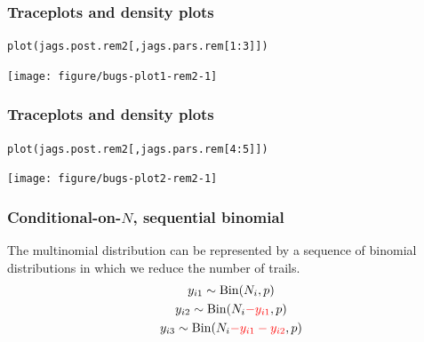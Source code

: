 \documentclass[color=usenames,dvipsnames]{beamer}\usepackage[]{graphicx}\usepackage[]{color}
\makeatletter
\newcommand{\hlnum}[1]{\textcolor[rgb]{0.69,0.494,0}{#1}}%
\newcommand{\hlopt}[1]{\textcolor[rgb]{0,0,0}{#1}}%
\newcommand{\hlstd}[1]{\textcolor[rgb]{0,0,0}{#1}}%
\newcommand{\hlkwd}[1]{\textcolor[rgb]{0.004,0.004,0.506}{#1}}%
\newenvironment{kframe}{%
 \def\at@end@of@kframe{}%
 \ifinner\ifhmode%
  \def\at@end@of@kframe{\end{minipage}}%
  \begin{minipage}{\columnwidth}%
 \fi\fi%
 \def\FrameCommand##1{\hskip\@totalleftmargin \hskip-\fboxsep
 \colorbox{shadecolor}{##1}\hskip-\fboxsep
     \hskip-\linewidth \hskip-\@totalleftmargin \hskip\columnwidth}%
 \MakeFramed {\advance\hsize-\width
   \@totalleftmargin\z@ \linewidth\hsize
   \@setminipage}}%
 {\par\unskip\endMakeFramed%
 \at@end@of@kframe}
\newenvironment{knitrout}{}{} %
\makeatother
\begin{document}
\begin{frame}[fragile]
  \frametitle{Traceplots and density plots}
\begin{knitrout}\footnotesize
{}\color{fgcolor}\begin{kframe}
\begin{alltt}
\hlkwd{plot}\hlstd{(jags.post.rem2[,jags.pars.rem[}\hlnum{1}\hlopt{:}\hlnum{3}\hlstd{]])}
\end{alltt}
\end{kframe}

{\centering \texttt{[image: figure/bugs-plot1-rem2-1]} 

}


\end{knitrout}
\end{frame}



\begin{frame}[fragile]
  \frametitle{Traceplots and density plots}
\begin{knitrout}\footnotesize
{}\color{fgcolor}\begin{kframe}
\begin{alltt}
\hlkwd{plot}\hlstd{(jags.post.rem2[,jags.pars.rem[}\hlnum{4}\hlopt{:}\hlnum{5}\hlstd{]])}
\end{alltt}
\end{kframe}

{\centering \texttt{[image: figure/bugs-plot2-rem2-1]} 

}


\end{knitrout}
\end{frame}





\begin{frame}%
  \frametitle{\normalsize Conditional-on-$N$, sequential binomial}
  The multinomial distribution can be represented by a sequence of
  binomial distributions in which we reduce the number of trails.
  \pause
  \vfill
  \large
  \begin{gather*}
    y_{i1} \sim \mathrm{Bin}(N_i, p) \\
    y_{i2} \sim \mathrm{Bin}(N_i{\color{red} -y_{i1}}, p) \\
    y_{i3} \sim \mathrm{Bin}(N_i{\color{red} -y_{i1}-y_{i2}}, p) \\
  \end{gather*}
\end{frame}
\end{document}
